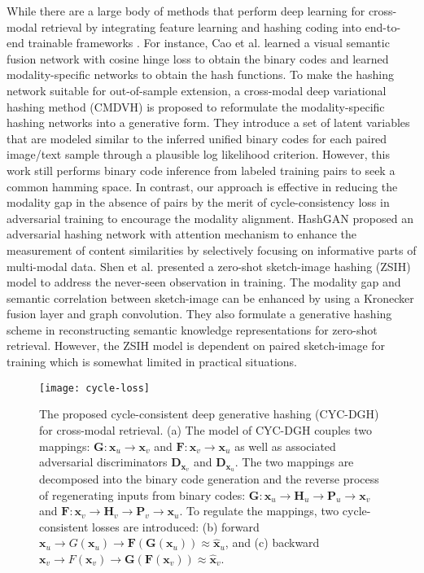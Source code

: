 \documentclass[10pt,journal,twocolumn]{IEEEtran}
\begin{document}
While there are a large body of methods that perform deep learning for cross-modal retrieval by integrating feature learning and hashing coding into end-to-end trainable frameworks \cite{Deep-binary,Deep-sketch-hashing,DVSH,CMDVH}. For instance, Cao et al. \cite{DVSH} learned a visual semantic fusion network with cosine hinge loss to obtain the binary codes and learned modality-specific networks to obtain the hash functions. To make the hashing network suitable for out-of-sample extension, a cross-modal deep variational hashing method (CMDVH) \cite{CMDVH} is proposed to reformulate the modality-specific hashing networks into a generative form. They introduce a set of latent variables that are modeled similar to the inferred unified binary codes for each paired image/text sample through a plausible log likelihood criterion. However, this work still performs binary code inference from labeled training pairs to seek a common hamming space. In contrast, our approach is effective in reducing the modality gap in the absence of pairs by the merit of cycle-consistency loss in adversarial training to encourage the modality alignment. HashGAN \cite{HashGAN}proposed an adversarial hashing network with attention mechanism to enhance the measurement of content similarities by selectively focusing on informative parts of multi-modal data. Shen et al. \cite{ZSIH} presented a zero-shot sketch-image hashing (ZSIH) model to address the never-seen observation in training. The modality gap and semantic correlation between sketch-image can be enhanced by using a Kronecker fusion layer and graph convolution. They also formulate a generative hashing scheme in reconstructing semantic knowledge representations for zero-shot retrieval. However, the ZSIH model is dependent on paired sketch-image for training which is somewhat limited in practical situations.


\begin{figure*}[!t]
\centering
\texttt{[image: cycle-loss]}
\caption{The proposed cycle-consistent deep generative hashing (CYC-DGH) for cross-modal retrieval. (a) The model of CYC-DGH couples two mappings: $\boldsymbol G: \boldsymbol x_u \rightarrow \boldsymbol x_v$ and $\boldsymbol F: \boldsymbol x_v \rightarrow \boldsymbol x_u$ as well as associated adversarial discriminators $\boldsymbol D_{\boldsymbol x_v}$ and $\boldsymbol D_{\boldsymbol x_u}$. The two mappings are decomposed into the binary code generation and the reverse process of regenerating inputs from binary codes: $\boldsymbol G: \boldsymbol x_u \rightarrow \boldsymbol H_u \rightarrow \boldsymbol P_u \rightarrow \boldsymbol x_v$ and $\boldsymbol F: \boldsymbol x_v \rightarrow \boldsymbol H_v \rightarrow \boldsymbol P_v \rightarrow \boldsymbol x_u$. To regulate the mappings, two cycle-consistent losses are introduced: (b) forward $\boldsymbol x_u \rightarrow G(\boldsymbol x_u) \rightarrow \boldsymbol F( \boldsymbol G(\boldsymbol x_u)) \approx \hat{\boldsymbol x}_u$, and (c) backward $\boldsymbol x_v \rightarrow F(\boldsymbol x_v) \rightarrow \boldsymbol G(\boldsymbol F(\boldsymbol x_v)) \approx \hat{\boldsymbol x}_v$. }
\label{fig:cycle-loss}
\end{figure*}
\end{document}
